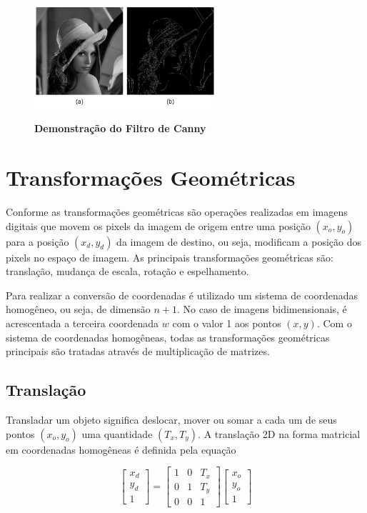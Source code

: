 \documentclass[12pt,oneside,a4paper,english,french,spanish,brazil,]{abntex2}
\begin{document}
\begin{figure}[ht]
\centering
\caption{\textbf{Demonstração do Filtro de Canny}}
\includegraphics[width=0.6\textwidth]{imagens/PDI_Canny.pdf}
\sourceAuthor
\label{fig:PDI_Canny}
\end{figure}


\section{Transformações Geométricas}

Conforme \citet{conci:2003} as transformações geométricas são operações realizadas em imagens digitais que movem os pixels da imagem de origem entre uma posição \((x_o,y_o)\) para a posição \((x_d,y_d)\) da imagem de destino, ou seja, modificam a posição dos pixels no espaço de imagem. As principais transformações geométricas são: translação, mudança de escala, rotação e espelhamento.

Para realizar a conversão de coordenadas é utilizado um sistema de coordenadas homogêneo, ou seja, de dimensão \(n+1\). No caso de imagens bidimensionais, é acrescentada a terceira coordenada \(w\) com o valor 1 aos pontos \((x, y)\). Com o sistema de coordenadas homogêneas, todas as transformações geométricas principais são tratadas através de multiplicação de matrizes.

\subsection{Translação}

Transladar um objeto significa deslocar, mover ou somar a cada um de seus pontos \((x_o,y_o)\) uma quantidade \((T_x,T_y)\). A translação 2D na forma matricial em coordenadas homogêneas é definida pela equação

\[
\begin{bmatrix}
x_d\\ 
y_d\\ 
1
\end{bmatrix}
=
\begin{bmatrix}
1 & 0 & T_x\\ 
0 & 1 & T_y\\ 
0 & 0 & 1
\end{bmatrix}
\begin{bmatrix}
x_o\\ 
y_o\\ 
1
\end{bmatrix}
\]
\end{document}
